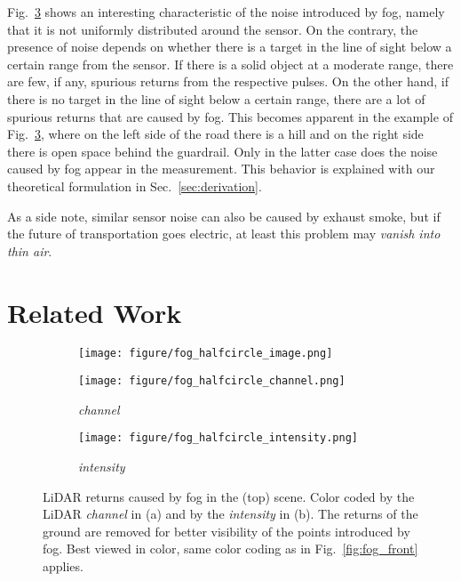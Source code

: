 \documentclass[10pt,twocolumn,letterpaper]{article}
\begin{document}
Fig.~\ref{fig:fog_halfcircle} shows an interesting characteristic of the noise introduced by fog, namely that it is not uniformly distributed around the sensor. On the contrary, the presence of noise depends on whether there is a target in the line of sight below a certain range from the sensor. If there is a solid object at a moderate range, there are few, if any, spurious returns from the respective pulses. On the other hand, if there is no target in the line of sight below a certain range, there are a lot of spurious returns that are caused by fog. This becomes apparent in the example of Fig.~\ref{fig:fog_halfcircle}, where on the left side of the road there is a hill and on the right side there is open space behind the guardrail. Only in the latter case does the noise caused by fog appear in the measurement. This behavior is explained with our theoretical formulation in Sec.~\ref{sec:derivation}.




As a side note, similar sensor noise can also be caused by exhaust smoke, but if the future of transportation goes electric, at least this problem may \textit{vanish into thin air}. 

 \section{Related Work}
\label{sec:related}

\begin{figure}
     \centering
     \begin{subfigure}[b]{\linewidth}
         \centering
         \texttt{[image: figure/fog\_halfcircle\_image.png]}
     \end{subfigure}
     \begin{subfigure}[b]{0.495\linewidth}
         \centering
         \texttt{[image: figure/fog\_halfcircle\_channel.png]}
         \caption{\textit{channel}}
         \label{fig:fog_halfcircle_channel}
     \end{subfigure}
     \hfill
     \begin{subfigure}[b]{0.49\linewidth}
         \centering
         \texttt{[image: figure/fog\_halfcircle\_intensity.png]}
         \caption{\textit{intensity}}
         \label{fig:fog_halfcircle_intensity}
     \end{subfigure}
     \caption{LiDAR returns caused by fog in the (top) scene. 
     Color coded by the LiDAR \textit{channel} in (a) and by the \textit{intensity} in (b). 
     The returns of the ground are removed for better visibility of the points introduced by fog.
     Best viewed in color, same color coding as in Fig.~\ref{fig:fog_front} applies.}
     \label{fig:fog_halfcircle}
\end{figure}
\end{document}
